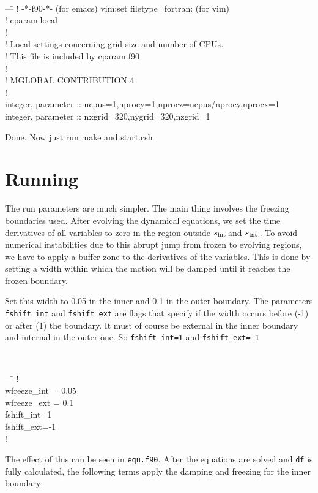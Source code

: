 \documentclass[a4paper,10pt]{article}
\newcommand{\rint}{$s_{\rm int}\,$}
\begin{document}
{\tt 
\begin{tabbing}
  ---\=\kill
!  -*-f90-*-  (for emacs)    vim:set filetype=fortran:  (for vim)\\
!  cparam.local\\
!\\
!  Local settings concerning grid size and number of CPUs.\\
!  This file is included by cparam.f90\\
!\\
! MGLOBAL CONTRIBUTION 4\\
!\\
\>integer, parameter :: ncpus=1,nprocy=1,nprocz=ncpus/nprocy,nprocx=1\\
\>integer, parameter :: nxgrid=320,nygrid=320,nzgrid=1
\end{tabbing}
}Done. Now just run make and start.csh


\section{Running}

The run parameters are much simpler. The main thing involves the freezing boundaries used. After evolving the dynamical equations, we set the time derivatives of all
variables to zero in the region outside \rint and \rint. To avoid numerical instabilities due to this abrupt jump from frozen to evolving regions, we have to apply a buffer zone to the derivatives of the variables. This is done by setting a width within which the motion will be damped until it reaches the frozen boundary. 

Set this width to 0.05 in the inner and 0.1 in the outer boundary. The parameters {\tt fshift\_int} and {\tt fshift\_ext} are flags that specify if the width occurs before (-1) or after (1) the boundary. It must of course be external in the inner boundary and internal in the outer one. So {\tt fshift\_int=1} and {\tt fshift\_ext=-1}

{\tt 
\begin{tabbing}
  ---\=\kill
!\\
  \>wfreeze\_int = 0.05\\
  \>wfreeze\_ext = 0.1\\
  \>fshift\_int=1\\
  \>fshift\_ext=-1\\
!
\end{tabbing}
}The effect of this can be seen in {\tt equ.f90}. After the equations are solved and {\tt df} is fully calculated, the following terms apply the damping and freezing for the inner boundary:
\end{document}
